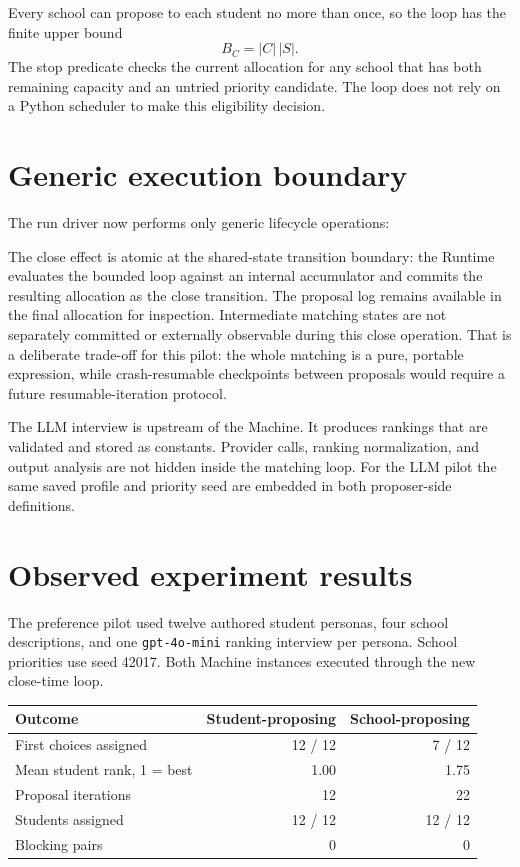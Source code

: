 \documentclass[11pt]{article}
\begin{document}


Every school can propose to each student no more than once, so the loop has the finite upper bound
\[
  B_C=|C|\,|S|.
\]
The stop predicate checks the current allocation for any school that has both remaining capacity and an untried priority candidate. The loop does not rely on a Python scheduler to make this eligibility decision.

\section{Generic execution boundary}
The run driver now performs only generic lifecycle operations:



The close effect is atomic at the shared-state transition boundary: the Runtime evaluates the bounded loop against an internal accumulator and commits the resulting allocation as the close transition. The proposal log remains available in the final allocation for inspection. Intermediate matching states are not separately committed or externally observable during this close operation. That is a deliberate trade-off for this pilot: the whole matching is a pure, portable expression, while crash-resumable checkpoints between proposals would require a future resumable-iteration protocol.

The LLM interview is upstream of the Machine. It produces rankings that are validated and stored as constants. Provider calls, ranking normalization, and output analysis are not hidden inside the matching loop. For the LLM pilot the same saved profile and priority seed are embedded in both proposer-side definitions.

\section{Observed experiment results}
The preference pilot used twelve authored student personas, four school descriptions, and one \texttt{gpt-4o-mini} ranking interview per persona. School priorities use seed 42017. Both Machine instances executed through the new close-time loop.

\begin{center}
\begin{tabular}{lrr}
\toprule
Outcome & Student-proposing & School-proposing \\
\midrule
First choices assigned & 12 / 12 & 7 / 12 \\
Mean student rank, 1 = best & 1.00 & 1.75 \\
Proposal iterations & 12 & 22 \\
Students assigned & 12 / 12 & 12 / 12 \\
Blocking pairs & 0 & 0 \\
\bottomrule
\end{tabular}
\end{center}
\end{document}
